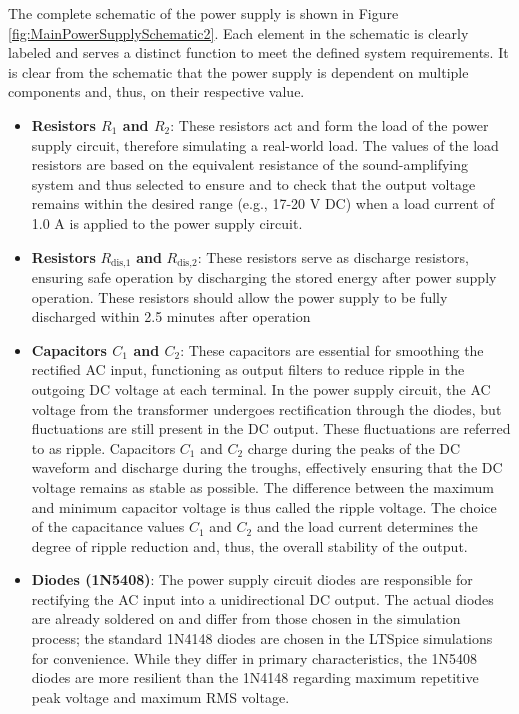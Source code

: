 The complete schematic of the power supply is shown in Figure \ref{fig:MainPowerSupplySchematic2}. Each element in the schematic is clearly labeled and serves a distinct function to meet the defined system requirements.
It is clear from the schematic that the power supply is dependent on multiple components and, thus, on their respective value.
\begin{itemize}
    \item \textbf{Resistors $R_{1}$ and $R_{2}$}: These resistors act and form the load of the power supply circuit, therefore simulating a real-world load. The values of the load resistors are based on the equivalent resistance of the sound-amplifying system and thus selected to ensure and to check that the output voltage remains within the desired range (e.g., 17-20 V DC) when a load current of 1.0 A is applied to the power supply circuit.
    
    \item {\textbf{Resistors} $R_{\text{dis,1}}$ \textbf{and} $R_{\text{dis,2}}$}: These resistors serve as discharge resistors, ensuring safe operation by discharging the stored energy after power supply operation. These resistors should allow the power supply to be fully discharged within 2.5 minutes after operation
    
    \item \textbf{Capacitors $C_{1}$ and $C_{2}$}: These capacitors are essential for smoothing the rectified AC input, functioning as output filters to reduce ripple in the outgoing DC voltage at each terminal. In the power supply circuit, the AC voltage from the transformer undergoes rectification through the diodes, but fluctuations are still present in the DC output. These fluctuations are referred to as ripple. Capacitors $C_{1}$ and $C_{2}$ charge during the peaks of the DC waveform and discharge during the troughs, effectively ensuring that the DC voltage remains as stable as possible. The difference between the maximum and minimum capacitor voltage is thus called the ripple voltage. The choice of the capacitance values $C_{1}$ and $C_{2}$ and the load current determines the degree of ripple reduction and, thus, the overall stability of the output.
    
    \item \textbf{Diodes (1N5408)}: The power supply circuit diodes are responsible for rectifying the AC input into a unidirectional DC output. The actual diodes are already soldered on and differ from those chosen in the simulation process; the standard 1N4148 diodes are chosen in the LTSpice simulations for convenience.
    While they differ in primary characteristics, the 1N5408 diodes are more resilient than the 1N4148 regarding maximum repetitive peak voltage and maximum RMS voltage.
    
\end{itemize}

